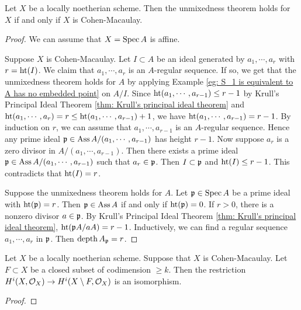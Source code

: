     \begin{theorem}\label{thm: unmixedness theorem for Cohen-Macaulay schemes}
        Let $X$ be a locally noetherian scheme.
        Then the unmixedness theorem holds for $X$ if and only if $X$ is Cohen-Macaulay.
    \end{theorem}
    \begin{proof}
        We can assume that $X = \operatorname{Spec} A$ is affine.

        Suppose $X$ is Cohen-Macaulay.
        Let $I \subset A$ be an ideal generated by $a_1,\cdots,a_r$ with $r = \operatorname{ht}(I)$.
        We claim that $a_1,\cdots,a_r$ is an $A$-regular sequence.
        If so, we get that the unmixedness theorem holds for $A$ by applying Example \ref{eg: S_1 is equivalent to A has no embedded point} on $A/I$. 
        Since $\operatorname{ht}(a_1,\cdots,a_{r-1}) \leq r-1$ by Krull's Principal Ideal Theorem \ref{thm: Krull's principal ideal theorem} and $\operatorname{ht}(a_1,\cdots,a_r) = r \leq \operatorname{ht}(a_1,\cdots,a_{r-1}) + 1$, we have $\operatorname{ht}(a_1,\cdots,a_{r-1}) = r-1$.
        By induction on $r$, we can assume that $a_1,\cdots,a_{r-1}$ is an $A$-regular sequence.
        Hence any prime ideal ${\mathfrak{p}} \in \operatorname{Ass} A/(a_1,\cdots,a_{r-1})$ has height $r-1$.
        Now suppose $a_r$ is a zero divisor in $A/(a_1,\cdots,a_{r-1})$.
        Then there exists a prime ideal ${\mathfrak{p}} \in \operatorname{Ass} A/(a_1,\cdots,a_{r-1})$ such that $a_r \in {\mathfrak{p}}$.
        Then $I \subset {\mathfrak{p}}$ and $\operatorname{ht}(I) \leq r-1$.
        This contradicts that $\operatorname{ht}(I) = r$.
        
        Suppose the unmixedness theorem holds for $A$.
        Let ${\mathfrak{p}} \in \operatorname{Spec} A$ be a prime ideal with $\operatorname{ht}({\mathfrak{p}}) = r$.
        Then ${\mathfrak{p}} \in \operatorname{Ass} A$ if and only if $\operatorname{ht}({\mathfrak{p}}) = 0$.
        If $r > 0$, there is a nonzero divisor $a \in {\mathfrak{p}}$.
        By Krull's Principal Ideal Theorem \ref{thm: Krull's principal ideal theorem}, $\operatorname{ht}({\mathfrak{p}} A/aA) = r-1$.
        Inductively, we can find a regular sequence $a_1,\cdots,a_r$ in ${\mathfrak{p}}$.
        Then $\operatorname{depth} A_{\mathfrak{p}} = r$.
    \end{proof}

    \begin{theorem}\label{thm: higher dimensional hartogs lemma for Cohen-Macaulay schemes}
        Let $X$ be a locally noetherian scheme.
        Suppose that $X$ is Cohen-Macaulay.
        Let $F \subset X$ be a closed subset of codimension $\geq k$.
        Then the restriction $H^i(X,{\mathcal{O}}_X) \to H^i(X\setminus F, {\mathcal{O}}_{X})$ is an isomorphism.
    \end{theorem}
    \begin{proof}
    \end{proof}

